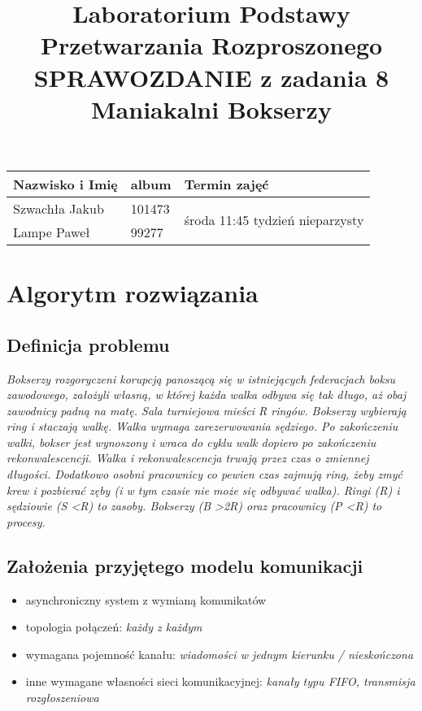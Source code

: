 \documentclass{article}
\title{\textbf{Laboratorium Podstawy Przetwarzania Rozproszonego \\ SPRAWOZDANIE z zadania 8 \\ Maniakalni Bokserzy}}
\author{}
\date{}
\begin{document}
\maketitle

\begin{center}
    \begin{tabular}{| l | l | l |}
    \hline
    \textbf{Nazwisko i Imię} & \textbf{album} & \textbf{Termin zajęć} \\ \hline
    Szwachła Jakub & 101473 & \multirow{2}{*}{środa 11:45 tydzień nieparzysty} \\
    Lampe Paweł & 99277 & \\
    \hline
    \end{tabular}
\end{center}

\section{Algorytm rozwiązania}
\subsection{Definicja problemu}
\emph{Bokserzy rozgoryczeni korupcją panoszącą się w istniejących federacjach boksu zawodowego, założyli własną, w której każda walka odbywa się tak długo, aż obaj zawodnicy padną na matę. Sala turniejowa mieści R ringów. Bokserzy wybierają ring i staczają walkę. Walka wymaga zarezerwowania sędziego. Po zakończeniu walki, bokser jest wynoszony i wraca do cyklu walk dopiero po zakończeniu rekonwalescencji. Walka i rekonwalescencja trwają przez czas o zmiennej długości. Dodatkowo osobni pracownicy co pewien czas zajmują ring, żeby zmyć krew i pozbierać zęby (i w tym czasie nie może się odbywać walka). Ringi (R) i sędziowie (S \textless R) to zasoby. Bokserzy (B \textgreater 2R) oraz pracownicy (P \textless R) to procesy.}

\subsection{Założenia przyjętego modelu komunikacji}
\begin{itemize}
\item asynchroniczny system z wymianą komunikatów
\item topologia połączeń: \emph{każdy z każdym}
\item wymagana pojemność kanału:  \emph{wiadomości w jednym kierunku / nieskończona}
\item inne wymagane własności sieci komunikacyjnej: \emph{kanały typu FIFO, transmisja rozgłoszeniowa}
\end{itemize}
\end{document}

